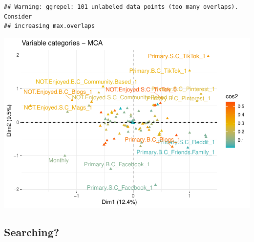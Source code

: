 \documentclass[
]{article}
\newenvironment{Shaded}{\begin{snugshade}}{\end{snugshade}}
\newcommand{\DataTypeTok}[1]{\textcolor[rgb]{0.13,0.29,0.53}{#1}}
\newcommand{\KeywordTok}[1]{\textcolor[rgb]{0.13,0.29,0.53}{\textbf{#1}}}
\newcommand{\NormalTok}[1]{#1}
\newcommand{\OtherTok}[1]{\textcolor[rgb]{0.56,0.35,0.01}{#1}}
\newcommand{\StringTok}[1]{\textcolor[rgb]{0.31,0.60,0.02}{#1}}
\begin{document}
\begin{Shaded}
\end{Shaded}

\begin{verbatim}
## Warning: ggrepel: 101 unlabeled data points (too many overlaps). Consider
## increasing max.overlaps
\end{verbatim}

\includegraphics{Average-User-MCA_files/figure-latex/mca not enjoyed all-3.pdf}

\hypertarget{searching}{%
\subsection{Searching?}\label{searching}}
\end{document}
